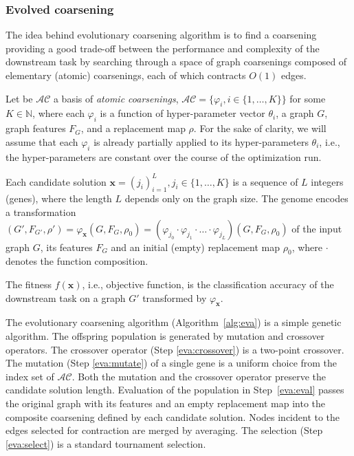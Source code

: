 \subsubsection{Evolved coarsening}


The idea behind evolutionary coarsening algorithm is to find a coarsening providing a good trade-off between the performance and complexity of the downstream task by searching through a space of graph coarsenings composed of elementary (atomic) coarsenings, each of which contracts $O(1)$ edges.

Let be $\mathcal{AC}$ a basis of \emph{atomic coarsenings}, $\mathcal{AC} = \{\varphi_i, i \in \{1,\dots,K\} \}$ for some $K \in \mathbb{N}$, where each $\varphi_i$
is a function of hyper-parameter vector $\theta_i$, a graph $G$, graph features $F_G$, and a replacement map $\rho$.
For the sake of clarity, we will assume that each $\varphi_i$ is already partially applied to its hyper-parameters $\theta_i$, i.e., the hyper-parameters are constant over the course of the optimization run.

Each candidate solution $\mathbf{x} = ({j_i})_{i=1}^{L}, j_i \in \{1,\dots,K\}$ is a sequence of $L$ integers (genes), where the length $L$ depends only on the graph size. The genome encodes a transformation $(G', F_{G'}, \rho') = \varphi_\mathbf{x}(G, F_G, \rho_0) = (\varphi_{j_0} \cdot \varphi_{j_1} \cdot \ldots \cdot \varphi_{j_L})(G, F_G, \rho_0)$ of the input graph $G$, its features $F_G$ and an initial (empty) replacement map $\rho_0$, where $\cdot$ denotes the function composition.

The fitness $f(\mathbf{x})$, i.e., objective function, is the classification accuracy of the downstream task on a graph $G'$ transformed by $\varphi_{\mathbf{x}}$.

The evolutionary coarsening algorithm (Algorithm~\ref{alg:eva}) is a simple genetic algorithm. The offspring population is generated by mutation and crossover operators. The crossover operator (Step \ref{eva:crossover}) is a two-point crossover. The mutation (Step \ref{eva:mutate}) of a single gene is a uniform choice from the index set of $\mathcal{AC}$. Both the mutation and the crossover operator preserve the candidate solution length.
Evaluation of the population in Step~\ref{eva:eval} passes the original graph with its features and an empty replacement map into the composite coarsening defined by each candidate solution. Nodes incident to the edges selected for contraction are merged by averaging.
The selection (Step \ref{eva:select}) is a standard tournament selection.

